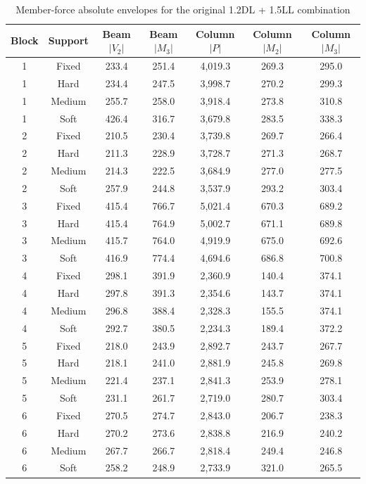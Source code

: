 \begin{table}[!htbp]
\fontsize{11}{13}\selectfont\setlength{\tabcolsep}{4pt}
\centering
\fontsize{11}{13}\selectfont\setlength{\tabcolsep}{4pt}\renewcommand{\arraystretch}{0.95}
\caption{Member-force absolute envelopes for the original 1.2DL + 1.5LL combination}\label{tab:seq54_force}
\begin{tabular*}{\linewidth}{@{\extracolsep{\fill}}ccccccc@{}}
\toprule
Block & Support & Beam $|V_2|$ & Beam $|M_3|$ & Column $|P|$ & Column $|M_2|$ & Column $|M_3|$\\
\midrule
1 & Fixed & 233.4 & 251.4 & 4,019.3 & 269.3 & 295.0 \\
1 & Hard & 234.4 & 247.5 & 3,998.7 & 270.2 & 299.3 \\
1 & Medium & 255.7 & 258.0 & 3,918.4 & 273.8 & 310.8 \\
1 & Soft & 426.4 & 316.7 & 3,679.8 & 283.5 & 338.3 \\
2 & Fixed & 210.5 & 230.4 & 3,739.8 & 269.7 & 266.4 \\
2 & Hard & 211.3 & 228.9 & 3,728.7 & 271.3 & 268.7 \\
2 & Medium & 214.3 & 222.5 & 3,684.9 & 277.0 & 277.5 \\
2 & Soft & 257.9 & 244.8 & 3,537.9 & 293.2 & 303.4 \\
3 & Fixed & 415.4 & 766.7 & 5,021.4 & 670.3 & 689.2 \\
3 & Hard & 415.4 & 764.9 & 5,002.7 & 671.1 & 689.8 \\
3 & Medium & 415.7 & 764.0 & 4,919.9 & 675.0 & 692.6 \\
3 & Soft & 416.9 & 774.4 & 4,694.6 & 686.8 & 700.8 \\
4 & Fixed & 298.1 & 391.9 & 2,360.9 & 140.4 & 374.1 \\
4 & Hard & 297.8 & 391.3 & 2,354.6 & 143.7 & 374.1 \\
4 & Medium & 296.8 & 388.4 & 2,328.3 & 155.5 & 374.1 \\
4 & Soft & 292.7 & 380.5 & 2,234.3 & 189.4 & 372.2 \\
5 & Fixed & 218.0 & 243.9 & 2,892.7 & 243.7 & 267.7 \\
5 & Hard & 218.1 & 241.0 & 2,881.9 & 245.8 & 269.8 \\
5 & Medium & 221.4 & 237.1 & 2,841.3 & 253.9 & 278.1 \\
5 & Soft & 231.1 & 261.7 & 2,719.0 & 280.7 & 303.4 \\
6 & Fixed & 270.5 & 274.7 & 2,843.0 & 206.7 & 238.3 \\
6 & Hard & 270.2 & 273.6 & 2,838.8 & 216.9 & 240.2 \\
6 & Medium & 267.7 & 266.7 & 2,818.4 & 249.4 & 246.8 \\
6 & Soft & 258.2 & 248.9 & 2,733.9 & 321.0 & 265.5 \\
\bottomrule
\end{tabular*}
\end{table}

